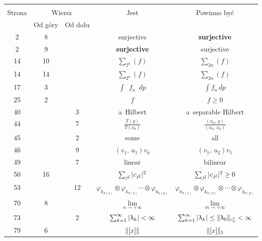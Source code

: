 \documentclass[a4paper,11pt]{article}
\numberwithin{equation}{section}
\renewcommand{\lambda}{\uplambda}
\begin{document}
\newpage
{}


\begin{center}
  \begin{tabular}{|c|c|c|c|c|}
    \hline
    & \multicolumn{2}{c|}{} & & \\
    Strona & \multicolumn{2}{c|}{Wiersz} & Jest
                              & Powinno być \\ \cline{2-3}
    & Od góry & Od dołu & & \\
    \hline
    2   &  8 & & surjective & \textbf{surjective} \\
    2   &  9 & & \textbf{surjective} & surjective \\
    14  & 10 & & $\sum_{ 2^{ n } }( f )$ & $\sum_{ 2 n }( f )$ \\
    14  & 14 & & $\sum_{ 2^{ n } }( f )$ & $\sum_{ 2 n }( f )$ \\
    17  &  3 & & $\int \;\: f_{ n } \;\: dp$ & $\int f_{ n } \, dp$ \\
    25  &  2 & & $f$ & $f \geq 0$ \\
    40  & & 3 & a~Hilbert & a~separable Hilbert \\
    44  & & 7 & $\frac{ T( y ) }{ T( x_{ 0 } ) }$
           & $\frac{ ( x_{ 0 }, \, y ) }{ ( x_{ 0 }, \, x_{ 0 } ) }$ \\
    45  & & 2 & some & all \\
    46  & & 9 & $( v_{ 1 }, \, u_{ 1 } ) v_{ k }$
           & $( v_{ 1 }, \, u_{ 2 } ) v_{ 1 }$ \\
    49  & & 7 & linear & bilinear \\
    50  & 16 & & $\sum_{ j l } | \hspace{0.05em}  c_{ j l }  \hspace{0.05em} |^{ 2 }$
           & $\sum_{ j l } | \hspace{0.05em}  c_{ j l }  \hspace{0.05em} |^{ 2 } \geq 0$ \\
    53  & & 12 & $\varphi_{ k_{ \sigma( 1 ) } } \otimes \varphi_{ k_{ \sigma( 2 ) } }
                 \cdots \otimes \varphi_{ k_{ n( p ) } }$
           & $\varphi_{ k_{ \sigma( 1 ) } } \otimes \varphi_{ k_{ \sigma( 2 ) } } \otimes
             \cdots \otimes \varphi_{ k_{ \sigma( p ) } }$ \\
    70  & 8 & & $\lim\limits_{ n \to +\infty }$ & $\lim\limits_{ m \to +\infty }$ \\
    73  & & 2 & $\sum_{ k = 1 }^{ \infty } \absOne{ \lambda_{ k } } < \infty$
           & $\sum_{ k = 1 }^{ \infty } \absOne{ \lambda_{ k } } \leq
             \norm{ \lambda_{ 0 } }_{ c_{ 0 }^{ * } } < \infty$ \\
    79  & 6 & & $\lVert{  [x]  }\rVert$ & $\lVert{  [x]  }\rVert_{ 1 }$ \\

\end{tabular}
\end{center}
\end{document}
